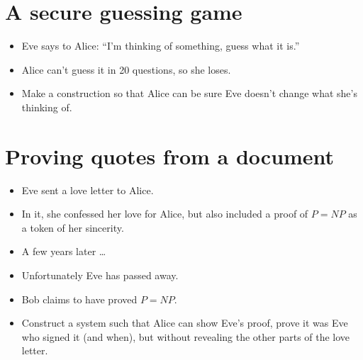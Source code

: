 \mode*

\section{A secure guessing game}

\begin{frame}
  \begin{exercise}[20 questions]
    \begin{itemize}
      \item Eve says to Alice: \enquote{I'm thinking of something, guess what 
        it is.}
      \item Alice can't guess it in 20 questions, so she loses.
      \item Make a construction so that Alice can be sure Eve doesn't change 
        what she's thinking of.
    \end{itemize}
  \end{exercise}
\end{frame}

\section{Proving quotes from a document}

\begin{frame}
  \begin{exercise}
    \begin{itemize}
      \item Eve sent a love letter to Alice.
      \item In it, she confessed her love for Alice, but also included a proof 
        of \(P = NP\) as a token of her sincerity.

        \pause

      \item A few years later \dots
      \item Unfortunately Eve has passed away.
      \item Bob claims to have proved \(P = NP\).
      \item Construct a system such that Alice can show Eve's proof, prove it 
        was Eve who signed it (and when), but without revealing the other parts 
        of the love letter.
    \end{itemize}
  \end{exercise}
\end{frame}

